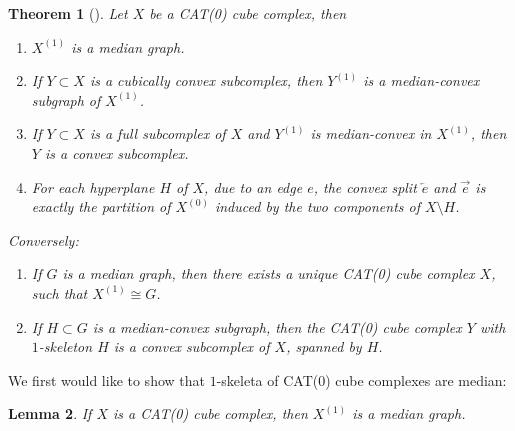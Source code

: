 \documentclass[12pt, a4paper]{article}
\theoremstyle{plain}
\newtheorem{theorem}{Theorem}[section]
\newtheorem{lemma}[theorem]{Lemma}
\theoremstyle{definition}
\theoremstyle{remark}
\begin{document}
    \begin{theorem}[\cite{hagen}]
        Let $X$ be a CAT(0) cube complex, then
        
        \begin{enumerate}
            \item $X^{(1)}$ is a median graph.
            \item If $Y \subset X$ is a cubically convex subcomplex, then $Y^{(1)}$ is a median-convex subgraph of $X^{(1)}$.
            \item If $Y \subset X$ is a full subcomplex of $X$ and $Y^{(1)}$ is median-convex in $X^{(1)}$, then $Y$ is a convex subcomplex.
            \item For each hyperplane $H$ of $X$, due to an edge $e$, the convex split $\overleftarrow{e}$ and $\overrightarrow{e}$ is exactly the partition of $X^{(0)}$ induced by the two components of $X \setminus H$.
        \end{enumerate}
        
        Conversely:
        
        \begin{enumerate}
            \item If $G$ is a median graph, then there exists a unique CAT(0) cube complex $X$, such that $X^{(1)} \cong G$.
            \item If $H \subset G$ is a median-convex subgraph, then the CAT(0) cube complex $Y$ with $1$-skeleton $H$ is a convex subcomplex of $X$, spanned by $H$.
        \end{enumerate}
    \end{theorem}
    
    We first would like to show that $1$-skeleta of CAT(0) cube complexes are median:
    
    \begin{lemma}
        If $X$ is a CAT(0) cube complex, then $X^{(1)}$ is a median graph.
    \end{lemma}
    
\end{document}
